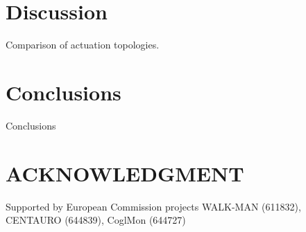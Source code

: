 \documentclass[letterpaper, 10 pt, conference]{ieeeconf}  %
\begin{document}
\section{Discussion} \label{sec:discussion}

Comparison of actuation topologies.

\section{Conclusions} \label{sec:conclusions}

Conclusions


\addtolength{\textheight}{-12cm}   %









\section*{ACKNOWLEDGMENT}

Supported by European Commission projects WALK-MAN (611832), CENTAURO (644839), CoglMon (644727)







\end{document}
